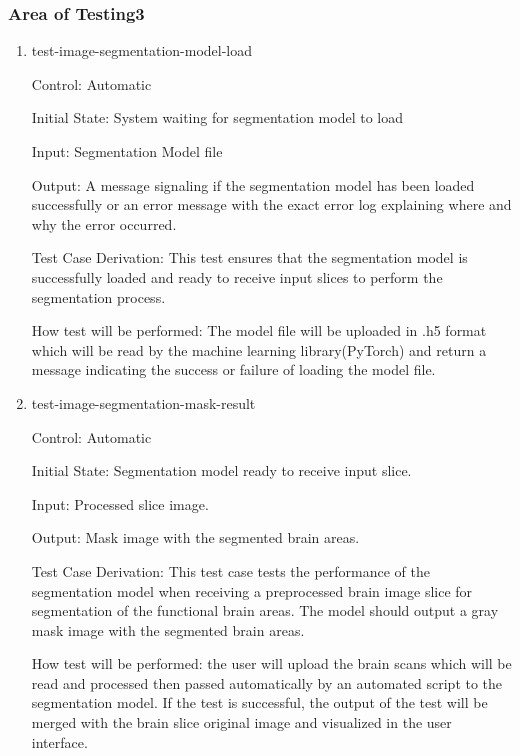 \documentclass[12pt, titlepage]{article}
\begin{document}
\subsubsection{Area of Testing3} \label{section5.3}

\begin{enumerate}

  \item{test-image-segmentation-model-load}

        Control: Automatic

        Initial State: System waiting for segmentation model to load

        Input: Segmentation Model file

        Output: A message signaling if the segmentation model has been loaded successfully or an error
        message with the exact error log explaining where and why the error occurred.

        Test Case Derivation: This test ensures that the segmentation model is successfully loaded
        and ready to receive input slices to perform the segmentation process.

        How test will be performed: The model file will be uploaded in .h5 format which will be read by
        the machine learning library(PyTorch) and return a message indicating the success or failure of loading the model file.

  \item{test-image-segmentation-mask-result}

        Control: Automatic

        Initial State: Segmentation model ready to receive input slice.

        Input: Processed slice image.

        Output: Mask image with the segmented brain areas.

        Test Case Derivation: This test case tests the performance of the segmentation model when
        receiving a preprocessed brain image slice for segmentation of the functional brain areas.
        The model should output a gray mask image with the segmented brain areas.

        How test will be performed: the user will upload the brain scans which will be read and processed then
        passed automatically by an automated script to the segmentation model. If the test is successful, the output
        of the test will be merged with the brain slice original image and visualized in the user interface.

\end{enumerate}
\end{document}
